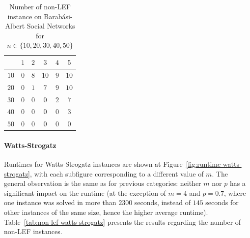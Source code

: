 \documentclass{article}
\begin{document}
\begin{table}[htb]
\centering
\begin{tabular}{|c|c|c|c|c|c|}
	\hline
	\backslashbox{$n$}{$m$} & $1$ & $2$ & $3$ & $4$ & $5$ \\ \hline
	$10$ & $0$ & $8$ & $10$ & $9$ & $10$ \\
	$20$ & $0$ & $1$ & $7$ & $9$ & $10$ \\
	$30$ & $0$ & $0$ & $0$ & $2$ & $7$ \\
	$40$ & $0$ & $0$ & $0$ & $0$ & $3$ \\
	$50$ & $0$ & $0$ & $0$ & $0$ & $0$ \\
	\hline
\end{tabular}
\caption{Number of non-LEF instance on Barab\'asi-Albert Social Networks for $n \in \{10,20,30,40,50\}$\label{tab:non-lef-barabasi-albert}}
\end{table}

\paragraph{Watts-Strogatz} Runtimes for Watts-Strogatz instances are shown at Figure~\ref{fig:runtime-watts-strogatz}, with each subfigure corresponding to a different value of  $m $. The general observation is the same as for previous categories: neither $m$ nor $p$ has a significant impact on the runtime (at the exception of $m=4$ and $p=0.7$, where one instance was solved in more than $2300$ seconds, instead of $145$ seconds for other instances of the same size, hence the higher average runtime). Table~\ref{tab:non-lef-watts-strogatz} presents the results regarding the number of non-LEF instances.
\end{document}
